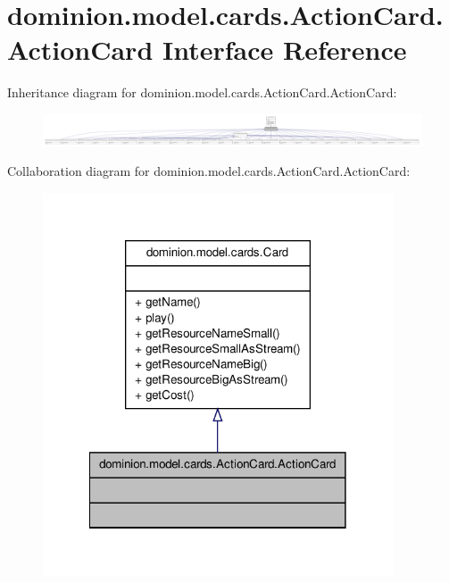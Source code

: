 \hypertarget{interfacedominion_1_1model_1_1cards_1_1ActionCard_1_1ActionCard}{\section{dominion.\-model.\-cards.\-Action\-Card.\-Action\-Card \-Interface \-Reference}
\label{interfacedominion_1_1model_1_1cards_1_1ActionCard_1_1ActionCard}
}


\-Inheritance diagram for dominion.\-model.\-cards.\-Action\-Card.\-Action\-Card\-:
\nopagebreak
\begin{figure}[H]
\begin{center}
\leavevmode
\includegraphics[width=350pt]{interfacedominion_1_1model_1_1cards_1_1ActionCard_1_1ActionCard__inherit__graph}
\end{center}
\end{figure}


\-Collaboration diagram for dominion.\-model.\-cards.\-Action\-Card.\-Action\-Card\-:
\nopagebreak
\begin{figure}[H]
\begin{center}
\leavevmode
\includegraphics[width=294pt]{interfacedominion_1_1model_1_1cards_1_1ActionCard_1_1ActionCard__coll__graph}
\end{center}
\end{figure}


